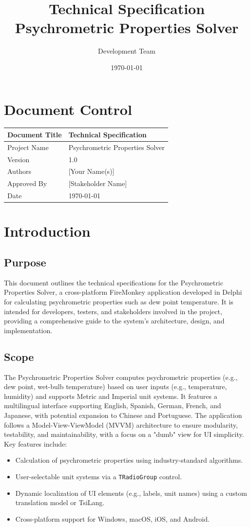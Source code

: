 \documentclass[12pt,a4paper]{article}
\title{Technical Specification \\ Psychrometric Properties Solver}
\author{Development Team}
\date{\today}
\begin{document}
	\maketitle
	\tableofcontents
	\newpage
	
	\section{Document Control}
	\begin{tabular}{|l|l|}
		\hline
		Document Title & Technical Specification \\
		\hline
		Project Name & Psychrometric Properties Solver \\
		\hline
		Version & 1.0 \\
		\hline
		Authors & [Your Name(s)] \\
		\hline
		Approved By & [Stakeholder Name] \\
		\hline
		Date & \today \\
		\hline
	\end{tabular}
	
	\section{Introduction}
	\subsection{Purpose}
	This document outlines the technical specifications for the Psychrometric Properties Solver, a cross-platform FireMonkey application developed in Delphi for calculating psychrometric properties such as dew point temperature. It is intended for developers, testers, and stakeholders involved in the project, providing a comprehensive guide to the system's architecture, design, and implementation.
	
	\subsection{Scope}
	The Psychrometric Properties Solver computes psychrometric properties (e.g., dew point, wet-bulb temperature) based on user inputs (e.g., temperature, humidity) and supports Metric and Imperial unit systems. It features a multilingual interface supporting English, Spanish, German, French, and Japanese, with potential expansion to Chinese and Portuguese. The application follows a Model-View-ViewModel (MVVM) architecture to ensure modularity, testability, and maintainability, with a focus on a "dumb" view for UI simplicity. Key features include:
	\begin{itemize}
		\item Calculation of psychrometric properties using industry-standard algorithms.
		\item User-selectable unit systems via a \texttt{TRadioGroup} control.
		\item Dynamic localization of UI elements (e.g., labels, unit names) using a custom translation model or TsiLang.
		\item Cross-platform support for Windows, macOS, iOS, and Android.
	\end{itemize}
	
\end{document}
